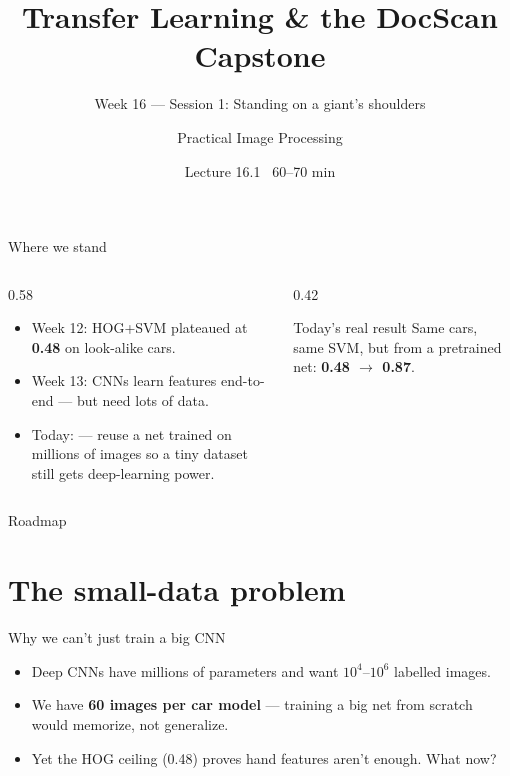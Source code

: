 \documentclass[10pt,aspectratio=169]{beamer}
\title{Transfer Learning \& the DocScan Capstone}
\subtitle{Week 16 — Session 1: Standing on a giant's shoulders}
\author{Practical Image Processing}
\date{Lecture 16.1 \textbullet\ 60--70 min}
\begin{document}
\maketitle

\begin{frame}{Where we stand}
  \begin{columns}[T]
    \begin{column}{0.58\textwidth}
      \begin{itemize}
        \item Week 12: HOG+SVM plateaued at \textbf{0.48} on look-alike cars.
        \item Week 13: CNNs learn features end-to-end — but need lots of data.
        \item \alert{Today:}  — reuse a net trained on millions of
              images so a tiny dataset still gets deep-learning power.
      \end{itemize}
    \end{column}
    \begin{column}{0.42\textwidth}
      \begin{alertblock}{Today's real result}
        Same cars, same SVM, but  from a pretrained net:
        \textbf{0.48 $\rightarrow$ 0.87}.
      \end{alertblock}
    \end{column}
  \end{columns}
\end{frame}

\begin{frame}{Roadmap}\tableofcontents\end{frame}

\section{The small-data problem}

\begin{frame}{Why we can't just train a big CNN}
  \begin{itemize}
    \item Deep CNNs have millions of parameters and want $10^4$--$10^6$ labelled images.
    \item We have \textbf{60 images per car model} — training a big net from scratch would
          memorize, not generalize.
    \item Yet the HOG ceiling (0.48) proves hand features aren't enough. What now?
  \end{itemize}
\end{frame}
\end{document}
